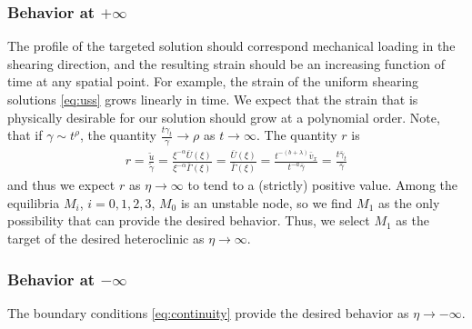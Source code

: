 \documentclass[a4paper,11pt]{article}
\def\bG{\bar{\Gamma}}
\def\bU{\bar{U}}
\def\tg{\tilde{\gamma}}
\def\tu{\tilde{u}}
\numberwithin{step}{dummy}
\begin{document}
\subsubsection{Behavior at $+\infty$}
The profile of the targeted solution should correspond mechanical loading in the  shearing direction, and the resulting strain should be an
increasing function of time at any spatial point. For example, the strain of the uniform shearing solutions \eqref{eq:uss} grows linearly in time. 
We expect that the strain that is physically desirable for our solution should grow at a polynomial order.  Note, that if  $\gamma \sim t^\rho$, the quantity $\frac{t {\gamma}_t}{{\gamma}} \rightarrow \rho$ as $t \rightarrow \infty$. The quantity $r$ is
\begin{align*}
 r=\frac{\tu}{\tg} = \frac{\xi^{-\alpha} \bU(\xi)}{\xi^{-\alpha} \bG(\xi)} = \frac{\bU(\xi)}{\bG(\xi)}
 =\frac{t^{-(b+ \lambda)}\bar{v}_x}{t^{-a}\bar{\gamma}} = \frac{t \bar{\gamma}_t}{\bar{\gamma}}%
\end{align*}
and thus we expect $r$ as $\eta \rightarrow \infty$ to tend to a (strictly) positive value. Among the equilibria $M_i$, $i=0,1,2,3$, $M_0$ is an unstable node, 
so we find $M_1$ as the only possibility that can provide the desired behavior. Thus, we select $M_1$ as the target of the desired heteroclinic as $\eta \to \infty$.

\subsubsection{Behavior at $-\infty$}\label{behminusinf}
The boundary conditions \eqref{eq:continuity} provide the desired behavior as $\eta \to -\infty$. 
\end{document}
